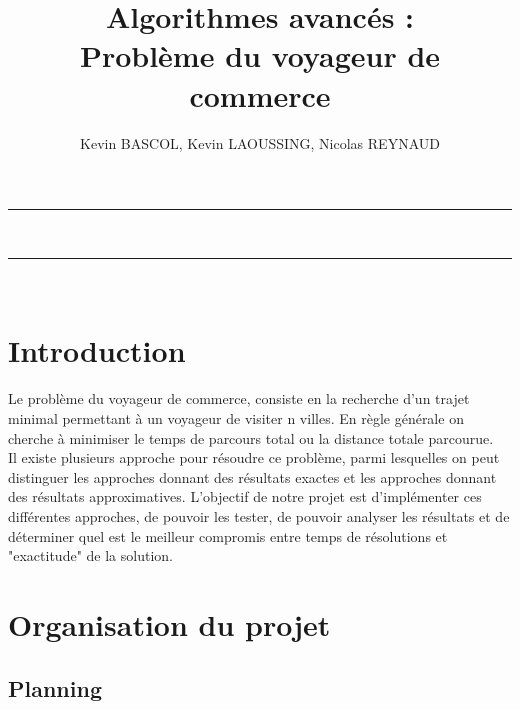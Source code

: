 \documentclass[10pt,a4paper]{report}
\author{Kevin BASCOL, Kevin LAOUSSING, Nicolas REYNAUD}
\title{Algorithmes avancés : \\Problème du voyageur de commerce}
\begin{document}
\makeatletter
	\begin{titlepage}
	
	\centering
		{
		\vspace*{5cm}
		\hrule height 2pt
		\vspace{0.7cm}
		\Huge \textbf{\@title}}\\
		\vspace{0.7cm}
		\hrule height 2pt
		
		\vfill
		\vspace{1cm}
		\@author\\
		\end{titlepage}
\makeatother
\setcounter{secnumdepth}{4}
\setcounter{tocdepth}{3}
\renewcommand{\contentsname}{Sommaire}
\begingroup\makeatletter
\def\@makeschapterhead#1{%
  {\parindent \z@ \raggedright
    \normalfont
    \interlinepenalty\@M
    \Huge \bfseries  #1\par\nobreak
    \vskip 20pt%
  }}\makeatother
\tableofcontents
\endgroup
\thispagestyle{empty}
\setcounter{page}{0}
\newpage


\section{Introduction}
\begin{flushleft}
Le problème du voyageur de commerce, consiste en la recherche d'un trajet minimal permettant à un voyageur de visiter n villes. En règle générale on cherche à minimiser le temps de parcours total ou la distance totale parcourue.\\
Il existe plusieurs approche pour résoudre ce problème, parmi lesquelles on peut distinguer les approches donnant des résultats exactes et les approches donnant des résultats approximatives.
L'objectif de notre projet est d'implémenter ces différentes approches, de pouvoir les tester, de pouvoir analyser les résultats et de déterminer quel est le meilleur compromis entre temps de résolutions et "exactitude" de la solution.
\end{flushleft}


\section{Organisation du projet}

	\subsection{Planning}
	
\end{document}
